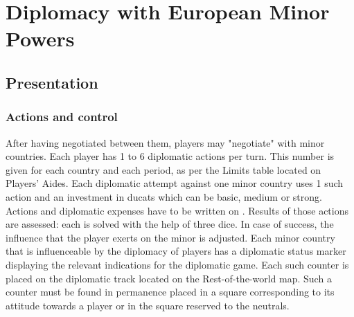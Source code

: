 
\section{Diplomacy with European Minor Powers}




\subsection{Presentation}
\subsubsection{Actions and control}
After having negotiated between them, players may "negotiate" with minor
countries. Each player has 1 to 6 diplomatic actions per turn. This number is
given for each country and each period, as per the Limits table located on
Players' Aides.  Each diplomatic attempt against one minor country uses 1 such
action and an investment in ducats which can be basic, medium or strong.
Actions and diplomatic expenses have to be written on .
Results of those actions are assessed: each is solved with the help of three
dice. In case of success, the influence that the player exerts on the minor is
adjusted.  Each minor country that is influenceable by the diplomacy of
players has a diplomatic status marker displaying the relevant indications for
the diplomatic game.  Each such counter is placed on the diplomatic track
located on the Rest-of-the-world map. Such a counter must be found in
permanence placed in a square corresponding to its attitude towards a player
or in the square reserved to the neutrals.

